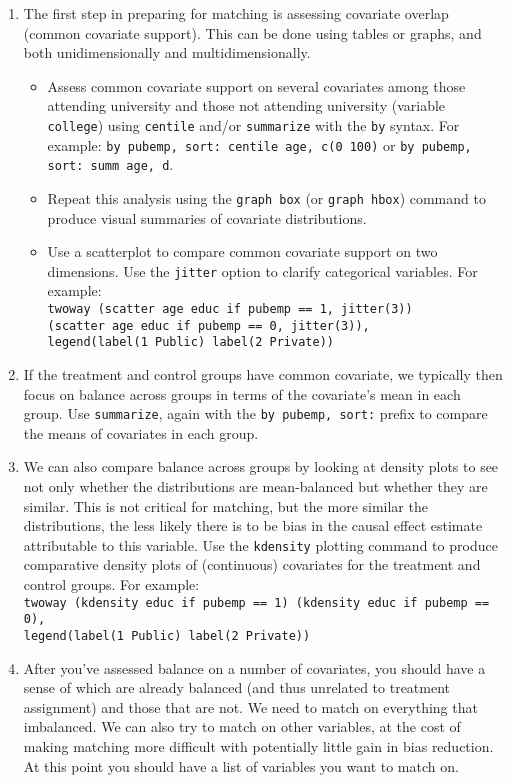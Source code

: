 \documentclass[a4paper,12pt]{article}
\begin{document}
\begin{enumerate}
\item The first step in preparing for matching is assessing covariate overlap (common covariate support). This can be done using tables or graphs, and both unidimensionally and multidimensionally. 
	\begin{itemize}
	\item Assess common covariate support on several covariates among those attending university and those not attending university (variable \texttt{college}) using \texttt{centile} and/or \texttt{summarize} with the \texttt{by} syntax. For example: \texttt{by pubemp, sort: centile age, c(0 100)} or \texttt{by pubemp, sort: summ age, d}.
	\item Repeat this analysis using the \texttt{graph box} (or \texttt{graph hbox}) command to produce visual summaries of covariate distributions.
	\item Use a scatterplot to compare common covariate support on two dimensions. Use the \texttt{jitter} option to clarify categorical variables. For example:\\ \texttt{twoway (scatter age educ if pubemp == 1, jitter(3))\\ (scatter age educ if pubemp == 0, jitter(3)),\\ legend(label(1 Public) label(2 Private))}
	\end{itemize}
\item If the treatment and control groups have common covariate, we typically then focus on balance across groups in terms of the covariate's mean in each group. Use \texttt{summarize}, again with the \texttt{by pubemp, sort:} prefix to compare the means of covariates in each group.
\item We can also compare balance across groups by looking at density plots to see not only whether the distributions are mean-balanced but whether they are similar. This is not critical for matching, but the more similar the distributions, the less likely there is to be bias in the causal effect estimate attributable to this variable. Use the \texttt{kdensity} plotting command to produce comparative density plots of (continuous) covariates for the treatment and control groups. For example:\\ \texttt{twoway (kdensity educ if pubemp == 1) (kdensity educ if pubemp == 0),\\ legend(label(1 Public) label(2 Private))}
\item After you've assessed balance on a number of covariates, you should have a sense of which are already balanced (and thus unrelated to treatment assignment) and those that are not. We need to match on everything that imbalanced. We can also try to match on other variables, at the cost of making matching more difficult with potentially little gain in bias reduction. At this point you should have a list of variables you want to match on.


\end{enumerate}
\end{document}
